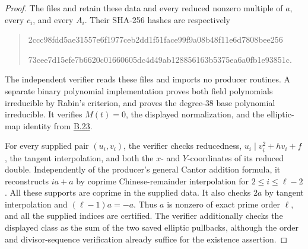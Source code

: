 \documentclass[11pt,a4paper]{article}
\newcommand{\statementref}[1]{\hyperlink{#1}{#1}}
\begin{document}
\begin{proof}
The files  and
 retain these data and
every reduced nonzero multiple of $a$, every $c_i$, and every $A_i$.
Their SHA-256 hashes are respectively
\begin{quote}\small\ttfamily
2ccc98fdd5ae31557e6f1977ceb2dd1f51face99f9a08b48f11e6d7808bee256
\par
73cee7d15efe7b6620c01660605dc4d49ab128856163b5375ea6a0fb1e93851c.
\end{quote}
The independent verifier  reads
these files and imports no producer routines. A separate binary
polynomial implementation proves both field polynomials irreducible
by Rabin's criterion, and proves the degree-38 base polynomial
irreducible. It verifies $M(t)=0$, the displayed normalization, and
the elliptic-map identity from \statementref{B.23}.

For every supplied pair $(u_i,v_i)$, the verifier checks reducedness,
$u_i\mid v_i^2+hv_i+f$, the tangent interpolation, and both the
$x$- and $Y$-coordinates of its reduced double. Independently of
the producer's general Cantor addition formula, it reconstructs
$ia+a$ by coprime Chinese-remainder interpolation for
$2\le i\le\ell-2$. All these supports are coprime in the supplied
data. It also checks $2a$ by tangent interpolation and
$(\ell-1)a=-a$. Thus $a$ is nonzero of exact prime order $\ell$,
and all the supplied indices are certified. The verifier additionally
checks the displayed class as the sum of the two saved elliptic
pullbacks, although the order and divisor-sequence verification
already suffice for the existence assertion.


\end{proof}
\end{document}
